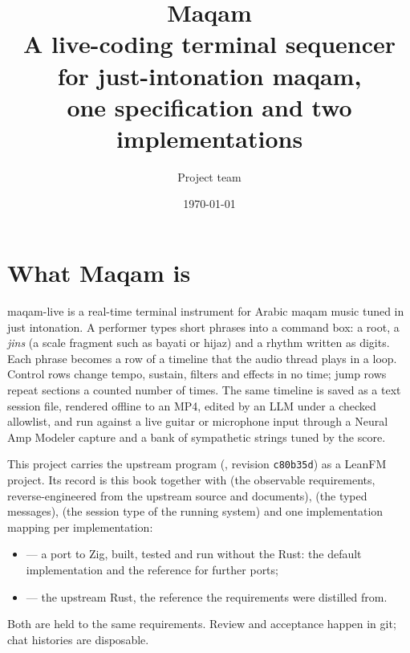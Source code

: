 \documentclass[11pt,oneside]{book}
\title{Maqam\\[0.5em]\large A live-coding terminal sequencer for just-intonation maqam,\\one specification and two implementations}
\author{Project team}
\date{\today}
\begin{document}
\frontmatter
\maketitle
\tableofcontents
\mainmatter

\chapter{What Maqam is}
maqam-live is a real-time terminal instrument for Arabic maqam music tuned in
just intonation. A performer types short phrases into a command box: a root, a
\emph{jins} (a scale fragment such as bayati or hijaz) and a rhythm written as
digits. Each phrase becomes a row of a timeline that the audio thread plays in
a loop. Control rows change tempo, sustain, filters and effects in no time;
jump rows repeat sections a counted number of times. The same timeline is saved
as a text session file, rendered offline to an MP4, edited by an LLM under a
checked allowlist, and run against a live guitar or microphone input through a
Neural Amp Modeler capture and a bank of sympathetic strings tuned by the score.

This project carries the upstream program (, revision
\texttt{c80b35d}) as a LeanFM project. Its record is this book together with
 (the observable requirements, reverse-engineered
from the upstream source and documents),  (the
typed messages),  (the session type of the running
system) and one implementation mapping per implementation:

\begin{itemize}
  \item {} — a port to Zig, built, tested and run without the
  Rust: the default implementation and the reference for further ports;
  \item {} — the upstream Rust, the reference the requirements
  were distilled from.
\end{itemize}

Both are held to the same requirements. Review and acceptance happen in git;
chat histories are disposable.
\end{document}
